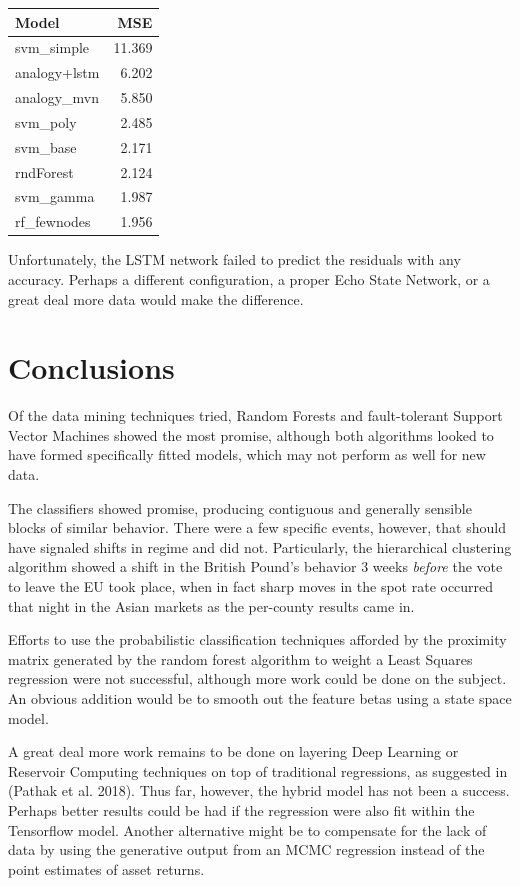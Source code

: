 \documentclass[]{article}
\begin{document}
\begin{longtable}[]{@{}lr@{}}
\toprule
Model & MSE\tabularnewline
\midrule
\endhead
svm\_simple & 11.369\tabularnewline
analogy+lstm & 6.202\tabularnewline
analogy\_mvn & 5.850\tabularnewline
svm\_poly & 2.485\tabularnewline
svm\_base & 2.171\tabularnewline
rndForest & 2.124\tabularnewline
svm\_gamma & 1.987\tabularnewline
rf\_fewnodes & 1.956\tabularnewline
\bottomrule
\end{longtable}

Unfortunately, the LSTM network failed to predict the residuals with any
accuracy. Perhaps a different configuration, a proper Echo State
Network, or a great deal more data would make the difference.

\section{Conclusions}\label{conclusions}

Of the data mining techniques tried, Random Forests and fault-tolerant
Support Vector Machines showed the most promise, although both
algorithms looked to have formed specifically fitted models, which may
not perform as well for new data.

The classifiers showed promise, producing contiguous and generally
sensible blocks of similar behavior. There were a few specific events,
however, that should have signaled shifts in regime and did not.
Particularly, the hierarchical clustering algorithm showed a shift in
the British Pound's behavior 3 weeks \emph{before} the vote to leave the
EU took place, when in fact sharp moves in the spot rate occurred that
night in the Asian markets as the per-county results came in.

Efforts to use the probabilistic classification techniques afforded by
the proximity matrix generated by the random forest algorithm to weight
a Least Squares regression were not successful, although more work could
be done on the subject. An obvious addition would be to smooth out the
feature betas using a state space model.

A great deal more work remains to be done on layering Deep Learning or
Reservoir Computing techniques on top of traditional regressions, as
suggested in (Pathak et al. 2018). Thus far, however, the hybrid model
has not been a success. Perhaps better results could be had if the
regression were also fit within the Tensorflow model. Another
alternative might be to compensate for the lack of data by using the
generative output from an MCMC regression instead of the point estimates
of asset returns.
\end{document}
